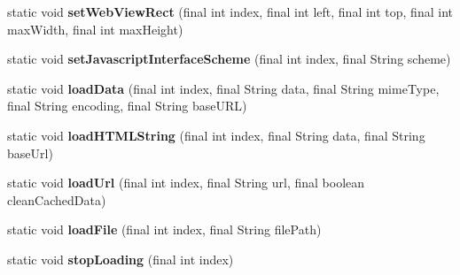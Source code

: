 \begin{DoxyCompactItemize}
\item 
\mbox{\label{classorg_1_1cocos2dx_1_1lib_1_1Cocos2dxWebViewHelper_a4d3fe1d1b12e373c7c58c94dc71f3711}} 
static void {\bfseries set\+Web\+View\+Rect} (final int index, final int left, final int top, final int max\+Width, final int max\+Height)
\item 
\mbox{\label{classorg_1_1cocos2dx_1_1lib_1_1Cocos2dxWebViewHelper_aa02c6149bae3e04ad46d309a38063c55}} 
static void {\bfseries set\+Javascript\+Interface\+Scheme} (final int index, final String scheme)
\item 
\mbox{\label{classorg_1_1cocos2dx_1_1lib_1_1Cocos2dxWebViewHelper_ad9ee5df7a17acb63cdf61925cc714019}} 
static void {\bfseries load\+Data} (final int index, final String data, final String mime\+Type, final String encoding, final String base\+U\+RL)
\item 
\mbox{\label{classorg_1_1cocos2dx_1_1lib_1_1Cocos2dxWebViewHelper_aaa4d5d1e351ffe1b673025a310262b83}} 
static void {\bfseries load\+H\+T\+M\+L\+String} (final int index, final String data, final String base\+Url)
\item 
\mbox{\label{classorg_1_1cocos2dx_1_1lib_1_1Cocos2dxWebViewHelper_a4662a50cbc51b317eedafdef541927ff}} 
static void {\bfseries load\+Url} (final int index, final String url, final boolean clean\+Cached\+Data)
\item 
\mbox{\label{classorg_1_1cocos2dx_1_1lib_1_1Cocos2dxWebViewHelper_a83d7495db43553b0f9f2fa3469e66fa3}} 
static void {\bfseries load\+File} (final int index, final String file\+Path)
\item 
\mbox{\label{classorg_1_1cocos2dx_1_1lib_1_1Cocos2dxWebViewHelper_abfc55e99cda3c93b86eb41af7129b058}} 
static void {\bfseries stop\+Loading} (final int index)
\item 
\mbox{\label{classorg_1_1cocos2dx_1_1lib_1_1Cocos2dxWebViewHelper_a003c9047097c1cee147d1f3fba11e61d}} 

\end{DoxyCompactItemize}

